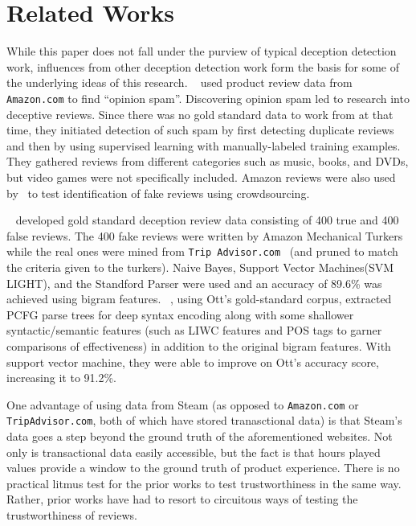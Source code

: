 \documentclass[9pt]{article}
\begin{document}


\section{Related Works}
\label{sec:related}

While this paper does not fall under the purview of typical deception detection work, influences from other deception detection work form the basis for some of the underlying ideas of this research. ~\cite{Jindal:08} used product review data from {\tt Amazon.com} to find ``opinion spam''. Discovering opinion spam led to research into deceptive reviews. Since there was no gold standard data to work from at that time, they initiated detection of such spam by first detecting duplicate reviews and then by using supervised learning with manually-labeled training examples. They gathered reviews from different categories such as music, books, and DVDs, but video games were not specifically included. Amazon reviews were also used by~\cite{Forn:14} to test identification of fake reviews using crowdsourcing.

~\cite{Ott:11} developed gold standard deception review data consisting of 400 true and 400 false reviews. The 400 fake reviews were written by Amazon Mechanical Turkers while the real ones were mined from {\tt Trip Advisor.com } (and pruned to match the criteria given to the turkers). Naive Bayes, Support Vector Machines(SVM LIGHT), and the Standford Parser were used and an accuracy of 89.6\% was achieved using bigram features. ~\cite{Feng:12a}, using Ott's gold-standard corpus, extracted PCFG parse trees for deep syntax encoding along with some shallower syntactic/semantic features (such as LIWC features and POS tags to garner comparisons of effectiveness) in addition to the original bigram features. With support vector machine, they were able to improve on Ott's accuracy score, increasing it to 91.2\%.

One advantage of using data from Steam (as opposed to {\tt Amazon.com} or {\tt TripAdvisor.com}, both of which have stored tranasctional data) is that Steam's data goes a step beyond the ground truth of the aforementioned websites. Not only is transactional data easily accessible, but the fact is that hours played values provide a window to the ground truth of product experience. There is no practical litmus test for the prior works to test trustworthiness in the same way. Rather, prior works have had to resort to circuitous ways of testing the trustworthiness of reviews.
\end{document}
